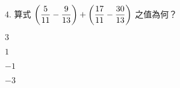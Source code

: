 \documentclass[12pt]{article}
\begin{document}
\begin{problem}
  \item[4.] 算式 $\biggl(\fraction{5}{11} - \fraction{9}{13}\biggr) + \biggl(\fraction{17}{11} - \fraction{30}{13}\biggr)$ 之值為何？
  \begin{choices}
    \item $3$
    \item $1$
    \item $-1$
    \item $-3$
  \end{choices}
\end{problem}
\end{document}
